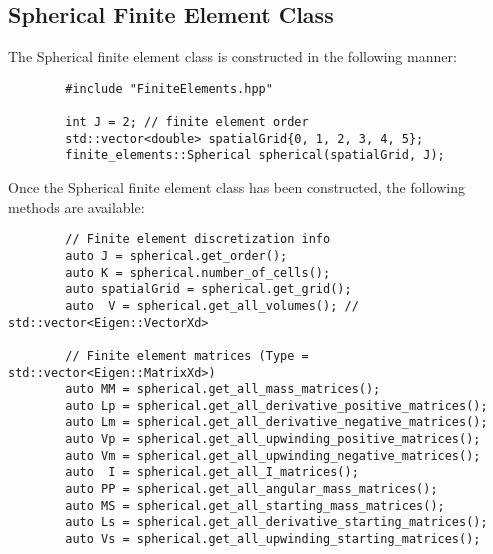\documentclass[../main.tex]{subfiles}
\begin{document}
    \subsection{Spherical Finite Element Class}
    The Spherical finite element class is constructed in the following manner:
    \begin{verbatim}
        #include "FiniteElements.hpp"
        
        int J = 2; // finite element order
        std::vector<double> spatialGrid{0, 1, 2, 3, 4, 5};
        finite_elements::Spherical spherical(spatialGrid, J);
    \end{verbatim}
    Once the Spherical finite element class has been constructed, the following methods are available:
    \begin{verbatim}
        // Finite element discretization info
        auto J = spherical.get_order();
        auto K = spherical.number_of_cells();
        auto spatialGrid = spherical.get_grid();
        auto  V = spherical.get_all_volumes(); // std::vector<Eigen::VectorXd>
        
        // Finite element matrices (Type = std::vector<Eigen::MatrixXd>)
        auto MM = spherical.get_all_mass_matrices();
        auto Lp = spherical.get_all_derivative_positive_matrices();
        auto Lm = spherical.get_all_derivative_negative_matrices();
        auto Vp = spherical.get_all_upwinding_positive_matrices();
        auto Vm = spherical.get_all_upwinding_negative_matrices();
        auto  I = spherical.get_all_I_matrices();
        auto PP = spherical.get_all_angular_mass_matrices();
        auto MS = spherical.get_all_starting_mass_matrices();
        auto Ls = spherical.get_all_derivative_starting_matrices();
        auto Vs = spherical.get_all_upwinding_starting_matrices();
    \end{verbatim}
    
\end{document}
